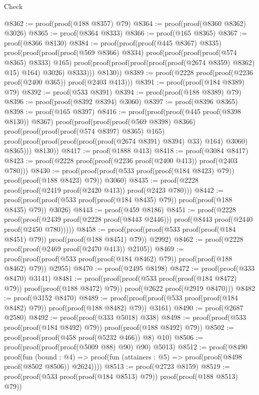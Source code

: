 \begin{lexlean}{Check}
\begin{coremodule}
@8362 := proof(proof(@188 @8357) @79)
@8364 := proof(proof(@8360 @8362) @3026)
@8365 := proof(@8364 @8333)
@8366 := proof(@165 @8365)
@8367 := proof(@8366 @8130)
@8384 := proof(proof(proof(@445 @8367) @8335)
      proof(proof(proof(proof(@569 @8366) @8334)
            proof(proof(proof(proof(@574 @8365) @8333) @165)
                proof(proof(proof(proof(proof(proof(@2674 @8359) @8362) @15) @164) @3026) @8333)))
          @8130))
@8389 := proof(@2228 proof(proof(@2236 proof(@2400 @365)) proof(@2403 @413)))
@8391 := proof(proof(@184 @8389) @79)
@8392 := proof(@533 @8391)
@8394 := proof(proof(@188 @8389) @79)
@8396 := proof(proof(@8392 @8394) @3060)
@8397 := proof(@8396 @8365)
@8398 := proof(@165 @8397)
@8416 := proof(proof(proof(@445 proof(@8398 @8130)) @8367)
      proof(proof(proof(proof(@569 @8398) @8366)
            proof(proof(proof(proof(@574 @8397) @8365) @165)
                proof(proof(proof(proof(proof(proof(@2674 @8391) @8394) @33) @164) @3060) @8365)))
          @8130))
@8417 := proof(@1888 @413)
@8418 := proof(@3084 @8417)
@8423 := proof(@2228 proof(proof(@2236 proof(@2400 @413)) proof(@2403 @780)))
@8430 := proof(proof(proof(@533 proof(proof(@184 @8423) @79)) proof(proof(@188 @8423) @79)) @3060)
@8435 := proof(@2228 proof(proof(@2419 proof(@2420 @413)) proof(@2423 @780)))
@8442 := proof(proof(proof(@533 proof(proof(@184 @8435) @79)) proof(proof(@188 @8435) @79)) @3026)
@8443 := proof(@459 @8186)
@8451 := proof(@2228
      proof(proof(@2439 proof(@2228 proof(@8443 @2446)))
          proof(@8443 proof(@2440 proof(@2450 @780)))))
@8458 := proof(proof(proof(@533 proof(proof(@184 @8451) @79)) proof(proof(@188 @8451) @79)) @2992)
@8462 := proof(@2228 proof(proof(@2469 proof(@2470 @413)) @2105))
@8469 := proof(proof(proof(@533 proof(proof(@184 @8462) @79)) proof(proof(@188 @8462) @79)) @2955)
@8470 := proof(@2495 @8198)
@8472 := proof(proof(@333 @8470) @3141)
@8481 := proof(proof(proof(@533 proof(proof(@184 @8472) @79)) proof(proof(@188 @8472) @79))
      proof(@2622 proof(@2919 @8470)))
@8482 := proof(@3152 @8470)
@8489 := proof(proof(proof(@533 proof(proof(@184 @8482) @79)) proof(proof(@188 @8482) @79)) @3161)
@8490 := proof(@2687 @2580)
@8492 := proof(proof(@333 @5018) @338)
@8498 := proof(proof(@533 proof(proof(@184 @8492) @79)) proof(proof(@188 @8492) @79))
@8502 := proof(proof(proof(@458 proof(@5232 @466)) @8) @10)
@8506 := proof(proof(proof(proof(@5009 @88) @90) @90) @5013)
@8512 := proof(@8490
      proof(fun (bound : @4) =>
        proof(fun (attainers : @5) => proof(proof(@8498 proof(@8502 @8506)) @2624))))
@8513 := proof(@2723 @8159)
@8519 := proof(proof(@533 proof(proof(@184 @8513) @79)) proof(proof(@188 @8513) @79))

\end{coremodule}
\end{lexlean}
